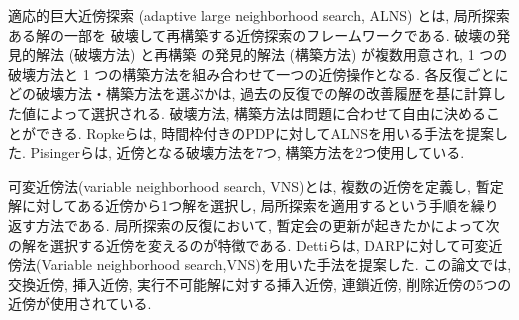 適応的巨大近傍探索 (adaptive large neighborhood search, ALNS) とは, 局所探索ある解の一部を 破壊して再構築する近傍探索のフレームワークである\cite{ALNS}. 破壊の発見的解法 (破壊方法) と再構築 の発見的解法 (構築方法) が複数用意され, 1 つの破壊方法と 1 つの構築方法を組み合わせて一つの近傍操作となる. 各反復ごとにどの破壊方法・構築方法を選ぶかは, 過去の反復での解の改善履歴を基に計算した値によって選択される. 破壊方法, 構築方法は問題に合わせて自由に決めることができる.
Ropkeらは, 時間枠付きのPDPに対してALNSを用いる手法を提案した\cite{pisinger}. Pisingerらは, 近傍となる破壊方法を7つ, 構築方法を2つ使用している.

可変近傍法(variable neighborhood search, VNS)とは, 複数の近傍を定義し, 暫定解に対してある近傍から1つ解を選択し, 局所探索を適用するという手順を繰り返す方法である. 局所探索の反復において, 暫定会の更新が起きたかによって次の解を選択する近傍を変えるのが特徴である. Dettiらは, DARPに対して可変近傍法(Variable neighborhood search,VNS)を用いた手法を提案した\cite{VNS}. この論文では, 交換近傍, 挿入近傍, 実行不可能解に対する挿入近傍, 連鎖近傍, 削除近傍の5つの近傍が使用されている.
